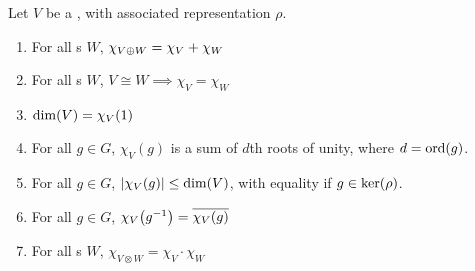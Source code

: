 \begin{boxproposition}\label{Ch2:Prop:Bhv_Char}
    Let $V$ be a \CGM, with associated representation $\rho$.
    \begin{enumerate}[label = \normalfont \arabic*., noitemsep]
        \item For all \CGM s $W$, $\chi_{V \oplus W} = \chi_V + \chi_W$
        \item  For all \CGM s $W$, $V \cong W \implies \chi_V = \chi_W$
        \item $\dim\!\left( V \right) = \chi_V(1)$
        \item For all $g \in G$, $\chi_V(g)$ is a sum of $d$th roots of unity, where $d = \operatorname{ord}\!\left( g \right)$.
        \item For all $g \in G$, $\left\lvert \chi_V(g) \right\rvert \leq \dim\!\left( V \right)$, with equality if $g \in \operatorname{ker}\!\left( \rho \right)$.
        \item For all $g \in G$, $\chi_V\!\left( g^{-1} \right) = \overline{\chi_V(g)}$
        \item For all \CGM s $W$, $\chi_{V \otimes W} = \chi_V \cdot \chi_W$
    \end{enumerate}
\end{boxproposition}
